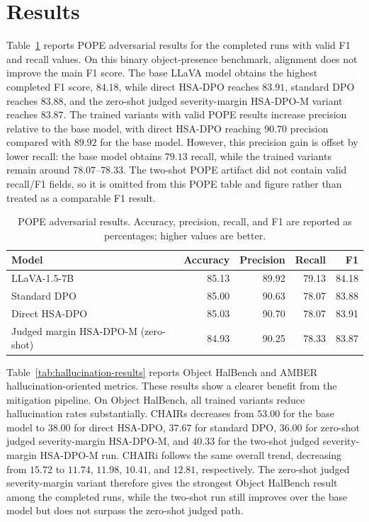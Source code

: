 \documentclass{article}
\begin{document}
\section{Results}
\label{sec:results}

Table~\ref{tab:pope-results} reports POPE adversarial results for the completed runs with valid F1 and recall values. On this binary object-presence benchmark, alignment does not improve the main F1 score. The base LLaVA model obtains the highest completed F1 score, $84.18$, while direct HSA-DPO reaches $83.91$, standard DPO reaches $83.88$, and the zero-shot judged severity-margin HSA-DPO-M variant reaches $83.87$. The trained variants with valid POPE results increase precision relative to the base model, with direct HSA-DPO reaching $90.70$ precision compared with $89.92$ for the base model. However, this precision gain is offset by lower recall: the base model obtains $79.13$ recall, while the trained variants remain around $78.07$--$78.33$. The two-shot POPE artifact did not contain valid recall/F1 fields, so it is omitted from this POPE table and figure rather than treated as a comparable F1 result.

\begin{table}[t]
  \centering
  \caption{POPE adversarial results. Accuracy, precision, recall, and F1 are reported as percentages; higher values are better.}
  \label{tab:pope-results}
  \small
  \begin{tabular}{lrrrr}
    \toprule
    Model & Accuracy & Precision & Recall & F1 \\
    \midrule
    LLaVA-1.5-7B & 85.13 & 89.92 & 79.13 & 84.18 \\
    Standard DPO & 85.00 & 90.63 & 78.07 & 83.88 \\
    Direct HSA-DPO & 85.03 & 90.70 & 78.07 & 83.91 \\
    Judged margin HSA-DPO-M (zero-shot) & 84.93 & 90.25 & 78.33 & 83.87 \\
    \bottomrule
  \end{tabular}
\end{table}

Table~\ref{tab:hallucination-results} reports Object HalBench and AMBER hallucination-oriented metrics. These results show a clearer benefit from the mitigation pipeline. On Object HalBench, all trained variants reduce hallucination rates substantially. CHAIRs decreases from $53.00$ for the base model to $38.00$ for direct HSA-DPO, $37.67$ for standard DPO, $36.00$ for zero-shot judged severity-margin HSA-DPO-M, and $40.33$ for the two-shot judged severity-margin HSA-DPO-M run. CHAIRi follows the same overall trend, decreasing from $15.72$ to $11.74$, $11.98$, $10.41$, and $12.81$, respectively. The zero-shot judged severity-margin variant therefore gives the strongest Object HalBench result among the completed runs, while the two-shot run still improves over the base model but does not surpass the zero-shot judged path.
\end{document}
